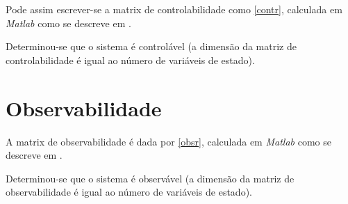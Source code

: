 \documentclass[%
  reprint,
  nofootinbib,
  amsmath,amssymb,
  aps,
  10pt,
  a4paper
]{revtex4-1}
\begin{document}

Pode assim escrever-se a matrix de controlabilidade como \eqref{contr}, calculada em {\it Matlab} como se descreve em .


Determinou-se que o sistema é controlável (a dimensão da matriz de controlabilidade é igual ao número de variáveis de estado).



\section{Observabilidade}
A matrix de observabilidade é dada por \eqref{obsr}, calculada em {\it Matlab} como se descreve em .


Determinou-se que o sistema é observável (a dimensão da matriz de observabilidade é igual ao número de variáveis de estado).
\end{document}
